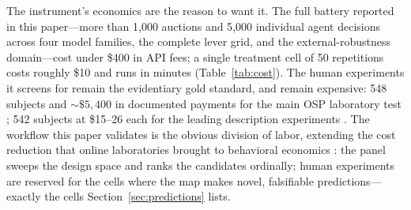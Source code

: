 The instrument's economics are the reason to want it. The full battery reported in this paper---more than 1{,}000 auctions and 5{,}000 individual agent decisions across four model families, the complete lever grid, and the external-robustness domain---cost under \$400 in API fees; a single treatment cell of 50 repetitions costs roughly \$10 and runs in minutes (Table~\ref{tab:cost}). The human experiments it screens for remain the evidentiary gold standard, and remain expensive: 548 subjects and ${\sim}\$5{,}400$ in documented payments for the main OSP laboratory test \citep{li2017obviously}; 542 subjects at \$15--26 each for the leading description experiments \citep{gonczarowski2024describing}. The workflow this paper validates is the obvious division of labor, extending the cost reduction that online laboratories brought to behavioral economics \citep{horton2011online}: the panel sweeps the design space and ranks the candidates ordinally; human experiments are reserved for the cells where the map makes novel, falsifiable predictions---exactly the cells Section~\ref{sec:predictions} lists.

\begin{table}[t]
\centering
\small
{}
\caption{Approximate cost of instruments for screening simplicity-preserving design levers. $^{\dagger}$\citet{li2017obviously}'s main experiment paid 144 subjects an average of \$37.54 (including a \$20 show-up fee), $\approx\$5{,}400$ total, documented for the main experiment only; the one-shot follow-up added 404 subjects (\$5 show-up plus incentives) with no published average, so a grand total is not recoverable. $^{\ddagger}$\citet{gonczarowski2024describing} paid Prolific participants an average of \pounds 15.0 ($\approx\$19$) and Cornell participants \$25.5 on average, across 542 subjects (their Appendix A.1).}
\label{tab:cost}
\end{table}

